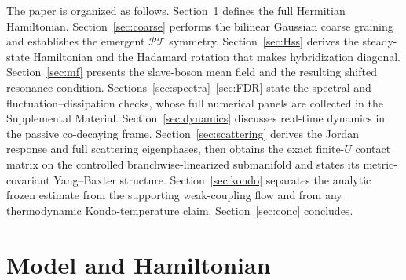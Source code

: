 \documentclass[%
  aps,prb,reprint,amsmath,amssymb,superscriptaddress,longbibliography,floatfix
]{revtex4-2}
\newcommand{\PT}{\mathcal{PT}}
\begin{document}
The paper is organized as follows.
Section~\ref{sec:model} defines the full Hermitian Hamiltonian.
Section~\ref{sec:coarse} performs the bilinear Gaussian coarse graining
and establishes the emergent $\PT$ symmetry.
Section~\ref{sec:Hss} derives the steady-state Hamiltonian and
the Hadamard rotation that makes hybridization diagonal.
Section~\ref{sec:mf} presents the slave-boson mean field and
the resulting shifted resonance condition.
Sections~\ref{sec:spectra}--\ref{sec:FDR} state the spectral and
fluctuation--dissipation checks, whose full numerical panels are collected in
the Supplemental Material.  Section~\ref{sec:dynamics} discusses real-time
dynamics in the passive co-decaying frame.  Section~\ref{sec:scattering}
derives the Jordan response and full scattering eigenphases, then obtains
the exact finite-$U$ contact matrix on the controlled branchwise-linearized
submanifold and states its metric-covariant Yang--Baxter structure.
Section~\ref{sec:kondo} separates the analytic frozen estimate from the
supporting weak-coupling flow and from any thermodynamic Kondo-temperature
claim.
Section~\ref{sec:conc} concludes.

\section{Model and Hamiltonian}
\label{sec:model}
\end{document}
